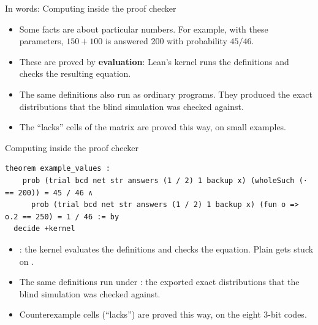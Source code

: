 \documentclass[aspectratio=169,11pt]{beamer}
\begin{document}
\begin{frame}{In words: Computing inside the proof checker}
  \begin{itemize}
    \item Some facts are about particular numbers. For example, with these parameters, $150+100$ is answered 200 with probability $45/46$.
    \item These are proved by \textbf{evaluation}: Lean's kernel runs the definitions and checks the resulting equation.
    \item The same definitions also run as ordinary programs. They produced the exact distributions that the blind simulation was checked against.
    \item The ``lacks'' cells of the matrix are proved this way, on small examples.
  \end{itemize}
\end{frame}


\begin{frame}[fragile]{Computing inside the proof checker}
\begin{Verbatim}
theorem example_values :
    prob (trial bcd net str answers (1 / 2) 1 backup x) (wholeSuch (· == 200)) = 45 / 46 ∧
      prob (trial bcd net str answers (1 / 2) 1 backup x) (fun o => o.2 == 250) = 1 / 46 := by
  decide +kernel
\end{Verbatim}
  \medskip
  \begin{itemize}\small
    \item {}: the kernel evaluates the definitions and checks the equation. Plain  gets stuck on .
    \item The same definitions run under : the exported exact distributions that the blind simulation was checked against.
    \item Counterexample cells (``lacks'') are proved this way, on the eight 3-bit codes.
  \end{itemize}
\end{frame}
\end{document}
